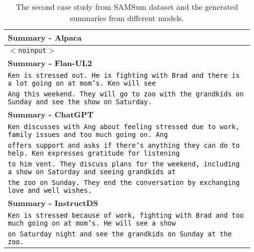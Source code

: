 \documentclass[11pt]{article}
\begin{document}
\begin{table*}[t]
\begin{adjustbox}{width=1.00\textwidth,center}
\begin{tabular}{ | l | }
        \textbf{Summary - Alpaca} \\ \hline
        \texttt{$<$noinput$>$}\\ \hline \hline
        
        \textbf{Summary - Flan-UL2} \\ \hline
        \texttt{Ken is stressed out. He is fighting with Brad and there is a lot going on at mom's. Ken will see } \\ 
        \texttt{Ang this weekend. They will go to zoo with the grandkids on Sunday and see the show on Saturday.}  \\ \hline \hline
        
        \textbf{Summary - ChatGPT} \\ \hline
        \texttt{Ken discusses with Ang about feeling stressed due to work, family issues and too much going on. Ang } \\
        \texttt{offers support and asks if there's anything they can do to help. Ken expresses gratitude for listening} \\
        \texttt{to him vent. They discuss plans for the weekend, including a show on Saturday and seeing grandkids at} \\
        \texttt{the zoo on Sunday. They end the conversation by exchanging love and well wishes. } \\ \hline \hline
        
        \textbf{Summary - InstructDS} \\ \hline
        \texttt{Ken is stressed because of work, fighting with Brad and too much going on at mom's. He will see a show} \\
        \texttt{on Saturday night and see the grandkids on Sunday at the zoo.} \\
        
        \bottomrule
        \end{tabular}
        \end{adjustbox}
        \caption{The second case study from SAMSum dataset and the generated summaries from different models.}
        \label{tab:SAMSum_examples2}
    \end{table*}
\end{document}
